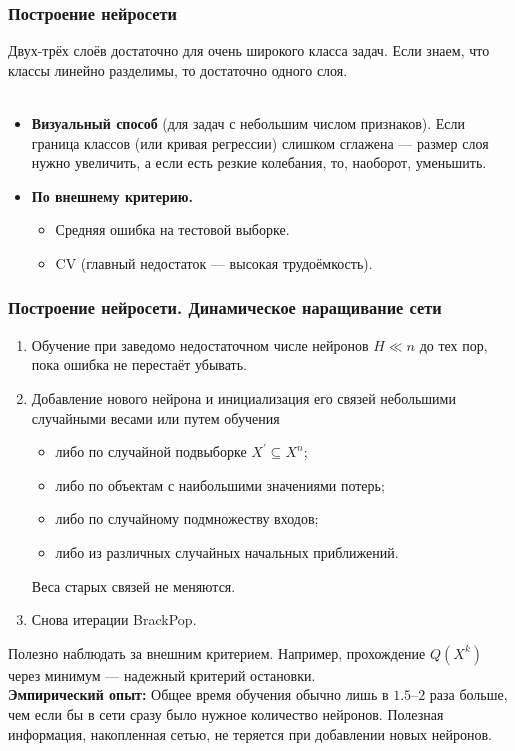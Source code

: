 \documentclass[10pt]{beamer}
\begin{document}
\begin{frame}
\frametitle{Построение нейросети}

 Двух-трёх слоёв достаточно для очень широкого класса задач. Если знаем, что классы линейно разделимы, то достаточно одного слоя.\\ 
\vspace{1cm}
 \\ 
\begin{itemize}
\item \textbf{Визуальный способ} (для задач с небольшим числом признаков). Если граница классов (или кривая регрессии) слишком сглажена --- размер слоя нужно увеличить, а если есть резкие колебания, то, наоборот, уменьшить.
\item \textbf{По внешнему критерию.} 
\begin{itemize}
\item Средняя ошибка на тестовой выборке. 
\item CV (главный недостаток --- высокая трудоёмкость).
\end{itemize}

\end{itemize}

\end{frame}


\begin{frame}
\frametitle{Построение нейросети. Динамическое наращивание сети}


\begin{enumerate}
\item Обучение при заведомо недостаточном числе нейронов $H \ll n$ до тех пор, пока ошибка не перестаёт убывать.
\item Добавление нового нейрона и инициализация его связей небольшими случайными весами или путем обучения 
\begin{itemize}
\item либо по случайной подвыборке $X^{'} \subseteq X^n$;
\item либо по объектам с наибольшими значениями потерь;
\item либо по случайному подмножеству входов;
\item либо из различных случайных начальных приближений.
\end{itemize}
Веса старых связей не меняются.
\item Снова итерации BrackPop.
\end{enumerate}
\vspace{0.6cm}
Полезно наблюдать за внешним критерием. Например, прохождение $Q(X^k)$ через минимум --- надежный критерий остановки. \\
  \vspace{0.6cm}
  \textbf{Эмпирический опыт:} Общее время обучения обычно лишь в $1.5$--$2$ раза больше, чем если бы в сети сразу было нужное количество нейронов. Полезная информация, накопленная сетью, не теряется при добавлении новых нейронов. 
\end{frame} 
\end{document}
